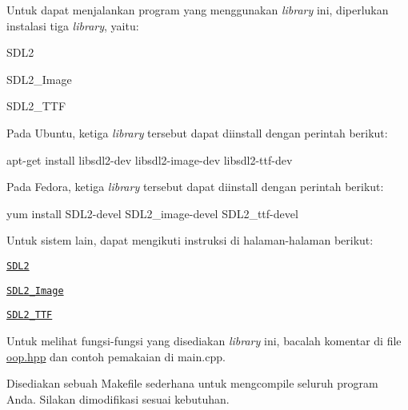 Untuk dapat menjalankan program yang menggunakan {\itshape library} ini, diperlukan instalasi tiga {\itshape library}, yaitu\+:


\begin{DoxyItemize}
\item S\+D\+L2
\item S\+D\+L2\+\_\+\+Image
\item S\+D\+L2\+\_\+\+T\+TF
\end{DoxyItemize}

Pada Ubuntu, ketiga {\itshape library} tersebut dapat diinstall dengan perintah berikut\+: \begin{DoxyVerb}apt-get install libsdl2-dev libsdl2-image-dev libsdl2-ttf-dev
\end{DoxyVerb}


Pada Fedora, ketiga {\itshape library} tersebut dapat diinstall dengan perintah berikut\+: \begin{DoxyVerb}yum install SDL2-devel SDL2_image-devel SDL2_ttf-devel
\end{DoxyVerb}


Untuk sistem lain, dapat mengikuti instruksi di halaman-\/halaman berikut\+:
\begin{DoxyItemize}
\item \href{http://lazyfoo.net/tutorials/SDL/01_hello_SDL/index.php}{\tt S\+D\+L2}
\item \href{https://www.libsdl.org/projects/SDL_image/}{\tt S\+D\+L2\+\_\+\+Image}
\item \href{https://www.libsdl.org/projects/SDL_ttf/}{\tt S\+D\+L2\+\_\+\+T\+TF}
\end{DoxyItemize}

Untuk melihat fungsi-\/fungsi yang disediakan {\itshape library} ini, bacalah komentar di file {\ttfamily \mbox{\hyperlink{oop_8hpp_source}{oop.\+hpp}}} dan contoh pemakaian di {\ttfamily main.\+cpp}.

Disediakan sebuah Makefile sederhana untuk mengcompile seluruh program Anda. Silakan dimodifikasi sesuai kebutuhan. 